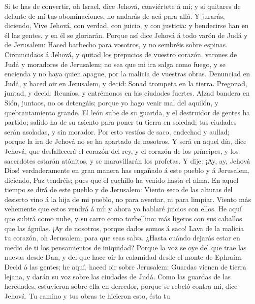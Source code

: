  Si te has de convertir, oh Israel, dice Jehová, conviértete
á mí; y si quitares de delante de mí tus abominaciones, no andarás de
acá para allá.  Y jurarás, diciendo, Vive Jehová, con
verdad, con juicio, y con justicia: y bendecirse han en él las gentes, y
en él se gloriarán.  Porque así dice Jehová á todo varón de
Judá y de Jerusalem: Haced barbecho para vosotros, y no sembréis sobre
espinas.  Circuncidaos á Jehová, y quitad los prepucios de
vuestro corazón, varones de Judá y moradores de Jerusalem; no sea que mi
ira salga como fuego, y se encienda y no haya quien apague, por la
malicia de vuestras obras.  Denunciad en Judá, y haced oir
en Jerusalem, y decid: Sonad trompeta en la tierra. Pregonad, juntad, y
decid: Reuníos, y entrémonos en las ciudades fuertes.  Alzad
bandera en Sión, juntaos, no os detengáis; porque yo hago venir mal del
aquilón, y quebrantamiento grande.  El león sube de su
guarida, y el destruidor de gentes ha partido; salido ha de su asiento
para poner tu tierra en soledad; tus ciudades serán asoladas, y sin
morador.  Por esto vestíos de saco, endechad y aullad;
porque la ira de Jehová no se ha apartado de nosotros.  Y
será en aquel día, dice Jehová, que desfallecerá el corazón del rey, y
el corazón de los príncipes, y los sacerdotes estarán atónitos, y se
maravillarán los profetas.  Y dije: ¡Ay, ay, Jehová Dios!
verdaderamente en gran manera has engañado á este pueblo y á Jerusalem,
diciendo, Paz tendréis; pues que el cuchillo ha venido hasta el alma.
 En aquel tiempo se dirá de este pueblo y de Jerusalem:
Viento seco de las alturas del desierto vino á la hija de mi pueblo, no
para aventar, ni para limpiar.  Viento más vehemente que
estos vendrá á mí: y ahora yo hablaré juicios con ellos. 
He aquí que subirá como nube, y su carro como torbellino: más ligeros
con sus caballos que las águilas. ¡Ay de nosotros, porque dados somos á
saco!  Lava de la malicia tu corazón, oh Jerusalem, para
que seas salva. ¿Hasta cuándo dejarás estar en medio de ti los
pensamientos de iniquidad?  Porque la voz se oye del que
trae las nuevas desde Dan, y del que hace oir la calamidad desde el
monte de Ephraim.  Decid á las gentes; he aquí, haced oir
sobre Jerusalem: Guardas vienen de tierra lejana, y darán su voz sobre
las ciudades de Judá.  Como las guardas de las heredades,
estuvieron sobre ella en derredor, porque se rebeló contra mí, dice
Jehová.  Tu camino y tus obras te hicieron esto, ésta tu

